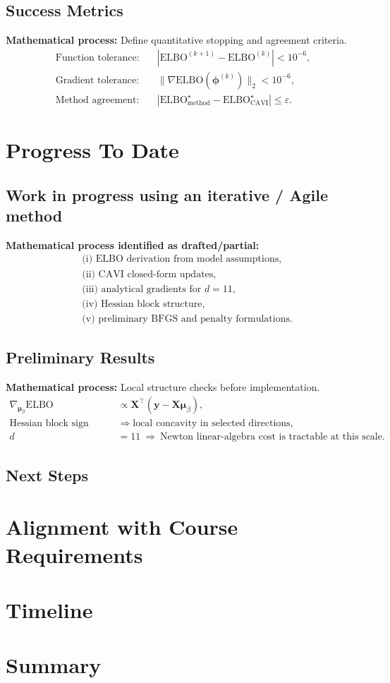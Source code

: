 \documentclass[11pt]{article}
\newcommand{\ELBO}{\mathrm{ELBO}}
\begin{document}
\subsection*{Success Metrics}

\textbf{Mathematical process:} Define quantitative stopping and agreement criteria.
\begin{align}
\text{Function tolerance:}
\quad &|\ELBO^{(k+1)}-\ELBO^{(k)}|<10^{-6},\\
\text{Gradient tolerance:}
\quad &\|\nabla\ELBO(\bm\phi^{(k)})\|_2<10^{-6},\\
\text{Method agreement:}
\quad &|\ELBO_{\text{method}}^\star-\ELBO_{\text{CAVI}}^\star|\le \varepsilon.
\end{align}

\section*{Progress To Date}

\subsection*{Work in progress using an iterative / Agile method}

\textbf{Mathematical process identified as drafted/partial:}
\begin{align}
&\text{(i) ELBO derivation from model assumptions,}\\
&\text{(ii) CAVI closed-form updates,}\\
&\text{(iii) analytical gradients for } d=11,\\
&\text{(iv) Hessian block structure,}\\
&\text{(v) preliminary BFGS and penalty formulations.}
\end{align}

\subsection*{Preliminary Results}

\textbf{Mathematical process:} Local structure checks before implementation.
\begin{align}
\nabla_{\bm\mu_\beta}\ELBO
&\propto \bm X^\top(\bm y-\bm X\bm\mu_\beta),\\
\text{Hessian block sign checks}
&\Rightarrow \text{local concavity in selected directions},\\
 d&=11\ \Rightarrow\ \text{Newton linear-algebra cost is tractable at this scale.}
\end{align}

\subsection*{Next Steps}


\section*{Alignment with Course Requirements}


\section*{Timeline}


\section*{Summary}
\end{document}
